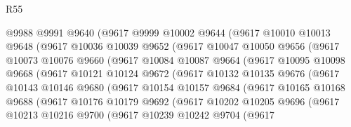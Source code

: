 \begin{lexlean}{R55}
\begin{coremodule}
                @9988
                @9991
                @9640
                (@9617
                  @9999
                  @10002
                  @9644
                  (@9617
                    @10010
                    @10013
                    @9648
                    (@9617
                      @10036
                      @10039
                      @9652
                      (@9617
                        @10047
                        @10050
                        @9656
                        (@9617
                          @10073
                          @10076
                          @9660
                          (@9617
                            @10084
                            @10087
                            @9664
                            (@9617
                              @10095
                              @10098
                              @9668
                              (@9617
                                @10121
                                @10124
                                @9672
                                (@9617
                                  @10132
                                  @10135
                                  @9676
                                  (@9617
                                    @10143
                                    @10146
                                    @9680
                                    (@9617
                                      @10154
                                      @10157
                                      @9684
                                      (@9617
                                        @10165
                                        @10168
                                        @9688
                                        (@9617
                                          @10176
                                          @10179
                                          @9692
                                          (@9617
                                            @10202
                                            @10205
                                            @9696
                                            (@9617
                                              @10213
                                              @10216
                                              @9700
                                              (@9617
                                                @10239
                                                @10242
                                                @9704
                                                (@9617

\end{coremodule}
\end{lexlean}
